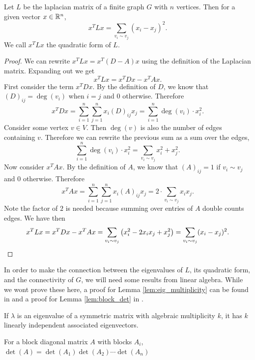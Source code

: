\documentclass[12pt]{article}
\begin{document}
\begin{theorem}
    Let $L$ be the laplacian matrix of a finite graph $G$ with $n$ vertices. Then for a given vector $x \in \mathbb{R}^n$,
    \[
        x^T L x = \sum_{v_i \sim v_j} (x_i - x_j)^2.
    \]
    We call $x^T L x$ the quadratic form of $L$.
\end{theorem}

\begin{proof}
    We can rewrite $x^T L x = x^T (D - A) x$ using the definition of the Laplacian matrix. Expanding out we get
    \[
        x^T L x = x^T D x - x^T A x
    .\]
    First consider the term $x^T D x$. By the definition of $D$, we know that $(D)_{ij} = \deg(v_i)$ when $i = j$ and $0$ otherwise. Therefore
    \[
        x^T D x = \sum_{i=1}^n \sum_{j=1}^n x_i (D)_{ij} x_j = \sum_{i=1}^n \deg(v_i) \cdot x_i^2
    .\]
    Consider some vertex $v \in V$. Then $\deg(v)$ is also the number of edges containing $v$. Therefore we can rewrite the previous sum as a sum over the edges,
    \[
        \sum_{i=1}^n \deg(v_i) \cdot x_i^2 = \sum_{v_i \sim v_j} x_i^2 + x_j^2
    .\]
    Now consider $x^T A x$. By the definition of $A$, we know that $(A)_{ij} = 1$ if $v_i \sim v_j$ and $0$ otherwise. Therefore
    \[
        x^T A x = \sum_{i=1}^n \sum_{j=1}^n x_i (A)_{ij} x_j = 2 \cdot\sum_{v_i \sim v_j} x_i x_j
    .\]
    Note the factor of $2$ is needed because summing over entries of $A$ double counts edges. We have then
    \[
        x^T L x = x^T D x - x^T A x = \sum_{v_i \sim v_j} \qty(x_i^2 - 2 x_i x_j + x_j^2) = \sum_{v_i \sim v_j} (x_i - x_j)^2
        .\qedhere
    \]
\end{proof}

In order to make the connection between the eigenvalues of $L$, its quadratic form, and the connectivity of $G$, we will need some results from linear algebra. While we wont prove these here, a proof for Lemma \ref{lem:eig_multiplicity} can be found in \cite{} and a proof for Lemma \ref{lem:block_det} in \cite{silvester2000determinants}.

\begin{lemma}
    \label{lem:eig_multiplicity}
    If $\lambda$ is an eigenvalue of a symmetric matrix with algebraic multiplicity $k$, it has $k$ linearly independent associated eigenvectors.
\end{lemma}

\begin{lemma}
    \label{lem:block_det}
    For a block diagonal matrix $A$ with blocks $A_i$, $\det(A) = \det(A_1) \det(A_2) \cdots \det(A_n)$
\end{lemma}
\end{document}
